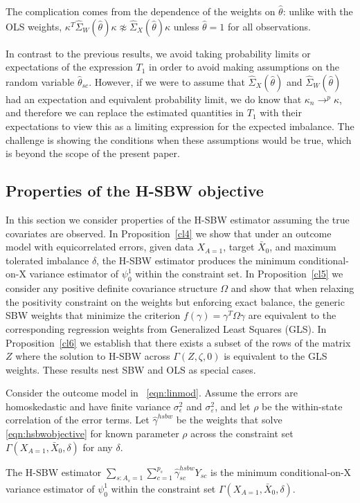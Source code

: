 \begin{remark}
    The complication comes from the dependence of the weights on $\hat{\theta}$: unlike with the OLS weights, $\kappa^T\hat{\Sigma}_W(\hat{\theta})\kappa \not\approx \hat{\Sigma}_X(\hat{\theta})\kappa$ unless $\hat{\theta} = 1$ for all observations. 
\end{remark}

\begin{remark}
    In contrast to the previous results, we avoid taking probability limits or expectations of the expression $T_1$ in order to avoid making assumptions on the random variable $\hat{\theta}_{sc}$. However, if we were to assume that $\hat{\Sigma}_X(\hat{\theta})$ and $\hat{\Sigma}_W(\hat{\theta})$ had an expectation and equivalent probability limit, we do know that $\kappa_n \to^p \kappa$, and therefore we can replace the estimated quantities in $T_1$ with their expectations to view this as a limiting expression for the expected imbalance. The challenge is showing the conditions when these assumptions would be true, which is beyond the scope of the present paper.
\end{remark}

\subsection{Properties of the H-SBW objective}\label{app:AsecII}
    In this section we consider properties of the H-SBW estimator assuming the true covariates are observed. In Proposition~\ref{cl4} we show that under an outcome model with equicorrelated errors, given data $X_{A=1}$, target $\bar{X}_0$, and maximum tolerated imbalance $\delta$, the H-SBW estimator produces the minimum conditional-on-X variance estimator of $\psi_0^1$ within the constraint set. In Proposition~\ref{cl5} we consider any positive definite covariance structure $\Omega$ and show that when relaxing the positivity constraint on the weights but enforcing exact balance, the generic SBW weights that minimize the criterion $f(\gamma) = \gamma^T\Omega\gamma$ are equivalent to the corresponding regression weights from Generalized Least Squares (GLS). In Proposition~\ref{cl6} we establish that there exists a subset of the rows of the matrix $Z$ where the solution to H-SBW across $\Gamma(Z, \zeta, 0)$ is equivalent to the GLS weights. These results nest SBW and OLS as special cases.

\begin{proposition}\label{cl4}
    Consider the outcome model in ~\eqref{eqn:linmod}. Assume the errors are homoskedastic and have finite variance $\sigma^2_{\epsilon}$ and $\sigma^2_{\varepsilon}$, and let $\rho$ be the within-state correlation of the error terms. Let $\hat{\gamma}^{hsbw}$ be the weights that solve \eqref{eqn:hsbwobjective} for known parameter $\rho$ across the constraint set $\Gamma(X_{A=1}, \bar{X}_0, \delta)$ for any $\delta$. 
    
    The H-SBW estimator $\sum_{s: A_s = 1}\sum_{c=1}^{p_s}\hat{\gamma}_{sc}^{hsbw}Y_{sc}$ is the minimum conditional-on-X variance estimator of $\psi_0^1$ within the constraint set $\Gamma(X_{A=1}, \bar{X}_0, \delta)$.
\end{proposition}



